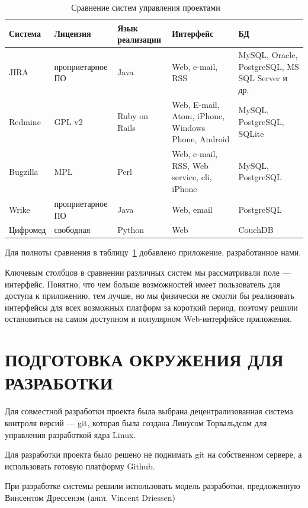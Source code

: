 \documentclass[14pt, a4paper]{extreport}
\begin{document}
\begin{table}[!htb]
  \caption{Сравнение систем управления проектами~\cite{jira_off}~\cite{redmine_off}~\cite{bugzilla_off}~\cite{wrike_off}}
  \label{tab:cmp_pm}
  \begin{center}
    \begin{tabularx}{\textwidth}{|l|X|X|X|X|}
      \hline
      Система & Лицензия & Язык реализации & Интерфейс & БД \\
      \hline
      JIRA & проприетарное ПО & Java & Web, e-mail, RSS & MySQL, Oracle, PostgreSQL, MS SQL Server и др. \\
      \hline
      Redmine & GPL v2 & Ruby on Rails & Web, E-mail, Atom, iPhone, Windows Phone, Android & MySQL, PostgreSQL, SQLite \\
      \hline
      Bugzilla & MPL & Perl & Web, e-mail, RSS, Web service, cli, iPhone & MySQL, PostgreSQL \\
      \hline
      Wrike & проприетарное ПО & Java & Web, email & PostgreSQL \\
      \hline
      Цифромед & свободная & Python & Web & CouchDB \\
      \hline
    \end{tabularx}
  \end{center}
\end{table}

Для полноты сравнения в таблицу~\ref{tab:cmp_pm} добавлено приложение, разработанное нами.

Ключевым столбцов в сравнении различных систем мы рассматривали поле --- интерфейс.
Понятно, что чем больше возможностей имеет пользователь для доступа к приложению, тем лучше,
но мы физически не смогли бы реализовать интерфейсы для всех возможных платформ за короткий период,
поэтому решили остановиться на самом доступном и популярном Web-интерфейсе приложения.

\chapter{\MakeTextUppercase{Подготовка окружения для разработки}}
Для совместной разработки проекта была выбрана децентрализованная система контроля
версий --- git, которая была создана Линусом Торвальдсом для управления разработкой
ядра Linux.~\cite{git_home}

Для разработки проекта было решено не поднимать git на собственном сервере, а использовать
готовую платформу Github.

При разработке системы решили использовать модель разработки, предложенную Винсентом
Дрессенэм (англ. Vincent Driessen)~\cite{git_branching_model}
\end{document}
